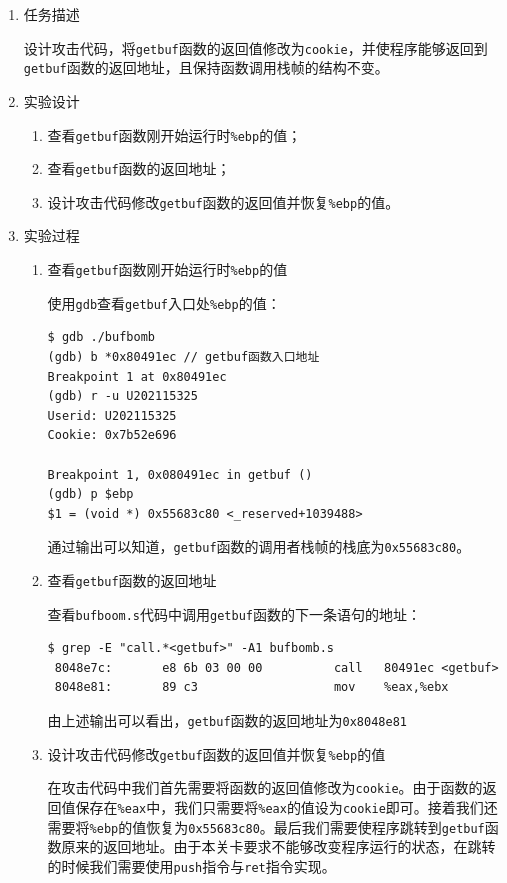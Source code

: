 \documentclass{paper}
\begin{document}
\begin{enumerate}
\item 任务描述

设计攻击代码，将\verb|getbuf|函数的返回值修改为\verb|cookie|，并使程序能够返回到\verb|getbuf|函数的返回地址，且保持函数调用栈帧的结构不变。

\item 实验设计

\begin{enumerate}
\item 查看\verb|getbuf|函数刚开始运行时\verb|%ebp|的值；
\item 查看\verb|getbuf|函数的返回地址；
\item 设计攻击代码修改\verb|getbuf|函数的返回值并恢复\verb|%ebp|的值。
\end{enumerate}

\item 实验过程

\begin{enumerate}
\item 查看\verb|getbuf|函数刚开始运行时\verb|%ebp|的值

使用\verb|gdb|查看\verb|getbuf|入口处\verb|%ebp|的值：
\begin{lstlisting}
$ gdb ./bufbomb
(gdb) b *0x80491ec // getbuf函数入口地址
Breakpoint 1 at 0x80491ec
(gdb) r -u U202115325
Userid: U202115325
Cookie: 0x7b52e696

Breakpoint 1, 0x080491ec in getbuf ()
(gdb) p $ebp
$1 = (void *) 0x55683c80 <_reserved+1039488>
\end{lstlisting}
通过输出可以知道，\verb|getbuf|函数的调用者栈帧的栈底为\verb|0x55683c80|。

\item 查看\verb|getbuf|函数的返回地址

查看\verb|bufboom.s|代码中调用\verb|getbuf|函数的下一条语句的地址：
\begin{lstlisting}
$ grep -E "call.*<getbuf>" -A1 bufbomb.s
 8048e7c:       e8 6b 03 00 00          call   80491ec <getbuf>
 8048e81:       89 c3                   mov    %eax,%ebx
\end{lstlisting}
由上述输出可以看出，\verb|getbuf|函数的返回地址为\verb|0x8048e81|

\item 设计攻击代码修改\verb|getbuf|函数的返回值并恢复\verb|%ebp|的值

在攻击代码中我们首先需要将函数的返回值修改为\verb|cookie|。由于函数的返回值保存在\verb|%eax|中，我们只需要将\verb|%eax|的值设为\verb|cookie|即可。接着我们还需要将\verb|%ebp|的值恢复为\verb|0x55683c80|。最后我们需要使程序跳转到\verb|getbuf|函数原来的返回地址。由于本关卡要求不能够改变程序运行的状态，在跳转的时候我们需要使用\verb|push|指令与\verb|ret|指令实现。


\end{enumerate}
\end{enumerate}
\end{document}

